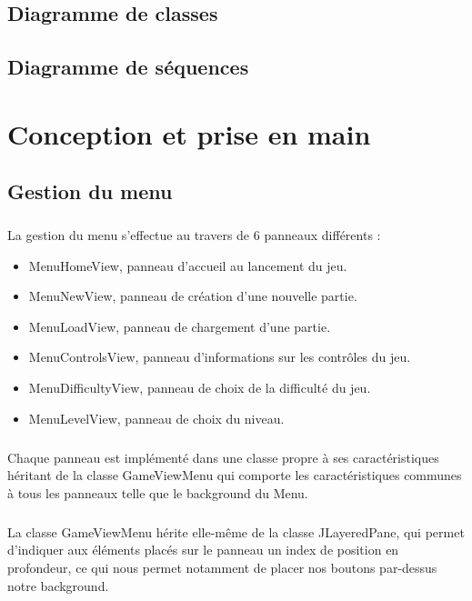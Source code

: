 \documentclass[a4paper,12pt]{report}
\begin{document}
\section{Diagramme de classes}
\section{Diagramme de séquences}

\chapter{Conception et prise en main}

\section{Gestion du menu}
\paragraph{}La gestion du menu s’effectue au travers de 6 panneaux différents : 
\begin{itemize}
\item MenuHomeView, panneau d’accueil au lancement du jeu.
\item MenuNewView, panneau de création d’une nouvelle partie.
\item MenuLoadView, panneau de chargement d’une partie.
\item MenuControlsView, panneau d’informations sur les contrôles du jeu.
\item MenuDifficultyView, panneau de choix de la difficulté du jeu.
\item MenuLevelView, panneau de choix du niveau.
\end{itemize}

\paragraph{}Chaque panneau est implémenté dans une classe propre à ses caractéristiques héritant de la classe GameViewMenu qui comporte les caractéristiques communes à tous les panneaux telle que le background du Menu.

\paragraph{}La classe GameViewMenu hérite elle-même de la classe JLayeredPane, qui permet d’indiquer aux éléments placés sur le panneau un index de position en profondeur, ce qui nous permet notamment de placer nos boutons par-dessus notre background.
\end{document}
